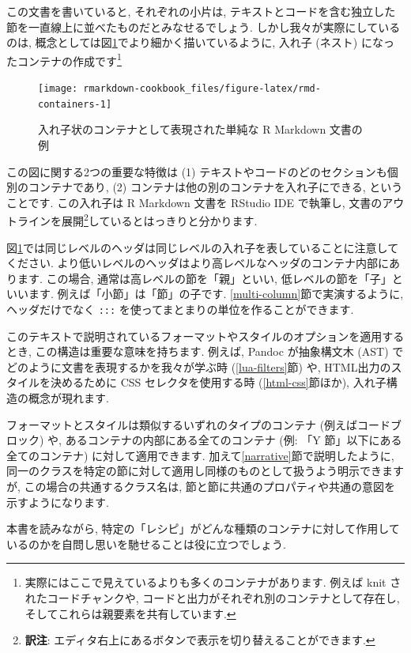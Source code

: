 \documentclass[
  11pt,
  lualatex,
  ja=standard]{bxjsreport}
\begin{document}
この文書を書いていると, それぞれの小片は, テキストとコードを含む独立した節を一直線上に並べたものだとみなせるでしょう. しかし我々が実際にしているのは, 概念としては図\ref{fig:rmd-containers}でより細かく描いているように, 入れ子 (ネスト) になったコンテナの作成です\footnote{実際にはここで見えているよりも多くのコンテナがあります. 例えば knit されたコードチャンクや, コードと出力がそれぞれ別のコンテナとして存在し, そしてこれらは親要素を共有しています.}

\begin{figure}

{\centering \texttt{[image: rmarkdown-cookbook\_files/figure-latex/rmd-containers-1]} 

}

\caption{入れ子状のコンテナとして表現された単純な R Markdown 文書の例}\label{fig:rmd-containers}
\end{figure}

この図に関する2つの重要な特徴は (1) テキストやコードのどのセクションも個別のコンテナであり, (2) コンテナは他の別のコンテナを入れ子にできる, ということです. この入れ子は R Markdown 文書を RStudio IDE で執筆し, 文書のアウトラインを展開\footnote{\textbf{訳注}: エディタ右上にあるボタンで表示を切り替えることができます.}しているとはっきりと分かります.

図\ref{fig:rmd-containers}では同じレベルのヘッダは同じレベルの入れ子を表していることに注意してください. より低いレベルのヘッダはより高レベルなヘッダのコンテナ内部にあります. この場合, 通常は高レベルの節を「親」といい, 低レベルの節を「子」といいます. 例えば「小節」は「節」の子です. \ref{multi-column}節で実演するように, ヘッダだけでなく \texttt{:::} を使ってまとまりの単位を作ることができます.

このテキストで説明されているフォーマットやスタイルのオプションを適用するとき, この構造は重要な意味を持ちます. 例えば, Pandoc が抽象構文木 (AST) でどのように文書を表現するかを我々が学ぶ時 (\ref{lua-filters}節) や, HTML出力のスタイルを決めるために CSS セレクタを使用する時 (\ref{html-css}節ほか), 入れ子構造の概念が現れます.

フォーマットとスタイルは類似するいずれのタイプのコンテナ (例えばコードブロック) や, あるコンテナの内部にある全てのコンテナ (例: 「Y 節」以下にある全てのコンテナ) に対して適用できます. 加えて\ref{narrative}節で説明したように, 同一のクラスを特定の節に対して適用し同様のものとして扱うよう明示できますが, この場合の共通するクラス名は, 節と節に共通のプロパティや共通の意図を示すようになります.

本書を読みながら, 特定の「レシピ」がどんな種類のコンテナに対して作用しているのかを自問し思いを馳せることは役に立つでしょう.
\end{document}
